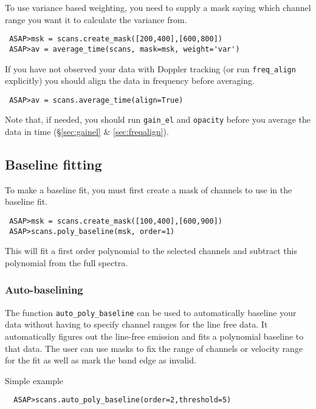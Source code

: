 \documentclass[11pt]{article}
\newcommand{\cmd}[1]{{\tt #1}}
\begin{document}
To use variance based weighting, you need to supply a mask saying which
channel range you want it to calculate the variance from.

\begin{verbatim}
 ASAP>msk = scans.create_mask([200,400],[600,800])
 ASAP>av = average_time(scans, mask=msk, weight='var')
\end{verbatim}

If you have not observed your data with Doppler tracking (or run
\cmd{freq\_align} explicitly) you should align the data in frequency
before averaging.

\begin{verbatim}
 ASAP>av = scans.average_time(align=True)
\end{verbatim}

Note that, if needed, you should run \cmd{gain\_el} and \cmd{opacity}
before you average the data in time (\S \ref{sec:gainel} \&
\ref{sec:freqalign}).

\subsection{Baseline fitting}

To make a baseline fit, you must first create
a mask of channels to use in the baseline fit.

\begin{verbatim}
 ASAP>msk = scans.create_mask([100,400],[600,900])
 ASAP>scans.poly_baseline(msk, order=1)
\end{verbatim}

This will fit a first order polynomial to the selected channels and subtract
this polynomial from the full spectra.

\subsubsection{Auto-baselining}

The function \cmd{auto\_poly\_baseline} can be used to automatically
baseline your data without having to specify channel ranges for the
line free data. It automatically figures out the line-free emission
and fits a polynomial baseline to that data. The user can use masks to
fix the range of channels or velocity range for the fit as well as
mark the band edge as invalid.

Simple example

\begin{verbatim}
  ASAP>scans.auto_poly_baseline(order=2,threshold=5)
\end{verbatim}
\end{document}
